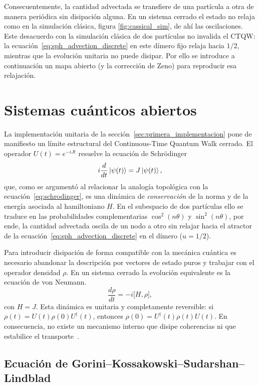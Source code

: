 Consecuentemente, la cantidad advectada se transfiere de una partícula a otra de manera periódica sin disipación alguna. En un sistema cerrado el estado no relaja como en la simulación clásica, figura \ref{fig:cassical_sim}, de ahí las oscilaciones. Este desacuerdo con la simulación clásica de dos partículas no invalida el CTQW: la ecuación~\eqref{eq:sph_advection_discrete} en este dímero fijo relaja hacia $1/2$, mientras que la evolución unitaria no puede disipar. Por ello se introduce a continuación un mapa abierto (y la corrección de Zeno) para reproducir esa relajación.

\section{Sistemas cuánticos abiertos}
\label{sec:sistemas-abiertos}

La implementación unitaria de la sección~\ref{sec:primera_implementacion} pone de manifiesto un límite estructural del Continuous-Time Quantum Walk cerrado. El operador $U(t)=e^{-iJt}$ resuelve la ecuación de Schrödinger
\begin{equation}
  i\frac{d}{dt}\ket{\psi(t)}=J\ket{\psi(t)},
  \label{eq:schrodinger-cerrado}
\end{equation}
que, como se argumentó al relacionar la analogía topológica con la ecuación~\eqref{eq:schrodinger}, es una dinámica de \emph{conservación} de la norma y de la energía asociada al hamiltoniano $H$. En el subespacio de dos partículas ello se traduce en las probabilidades complementarias $\cos^{2}(n\theta)$ y $\sin^{2}(n\theta)$, por ende, la cantidad advectada oscila de un nodo a otro sin relajar hacia el atractor de la ecuación~\eqref{eq:sph_advection_discrete} en el dímero ($u=1/2$).

Para introducir disipación de forma compatible con la mecánica cuántica es necesario abandonar la descripción por vectores de estado puros y trabajar con el operador densidad $\rho$. En un sistema cerrado la evolución equivalente es la ecuación de von Neumann. 
\begin{equation}
  \frac{d\rho}{dt}=-i\bigl[H,\rho\bigr],
  \label{eq:von-neumann}
\end{equation}
con $H=J$. Esta dinámica es unitaria y completamente reversible: si $\rho(t)=U(t)\rho(0)U^{\dagger}(t)$, entonces $\rho(0)=U^{\dagger}(t)\rho(t)U(t)$. En consecuencia, no existe un mecanismo interno que disipe coherencias ni que estabilice el transporte~\cite{nielsen2010}.

\subsection{Ecuación de Gorini--Kossakowski--Sudarshan--Lindblad}

